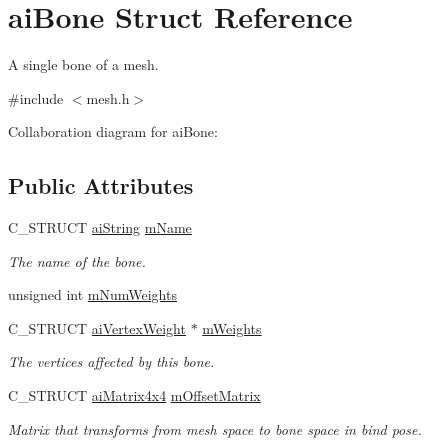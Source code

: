 \hypertarget{structai_bone}{\section{ai\-Bone Struct Reference}
\label{structai_bone}
}


A single bone of a mesh.  




{\ttfamily \#include $<$mesh.\-h$>$}



Collaboration diagram for ai\-Bone\-:
\subsection*{Public Attributes}
\begin{DoxyCompactItemize}
\item 
\hypertarget{structai_bone_acfb9bfd2a2c6302181d7c3cc1bb8bbf0}{C\-\_\-\-S\-T\-R\-U\-C\-T \hyperlink{structai_string}{ai\-String} \hyperlink{structai_bone_acfb9bfd2a2c6302181d7c3cc1bb8bbf0}{m\-Name}}\label{structai_bone_acfb9bfd2a2c6302181d7c3cc1bb8bbf0}

\begin{DoxyCompactList}\small\item\em The name of the bone. \end{DoxyCompactList}\item 
unsigned int \hyperlink{structai_bone_a87a79d42a0132753aac66397ad6f9b71}{m\-Num\-Weights}
\item 
\hypertarget{structai_bone_ade36319714b58c03ad46aae30a2724a4}{C\-\_\-\-S\-T\-R\-U\-C\-T \hyperlink{structai_vertex_weight}{ai\-Vertex\-Weight} $\ast$ \hyperlink{structai_bone_ade36319714b58c03ad46aae30a2724a4}{m\-Weights}}\label{structai_bone_ade36319714b58c03ad46aae30a2724a4}

\begin{DoxyCompactList}\small\item\em The vertices affected by this bone. \end{DoxyCompactList}\item 
\hypertarget{structai_bone_a1dd6c4f24a1384c05da281692be3e78d}{C\-\_\-\-S\-T\-R\-U\-C\-T \hyperlink{structai_matrix4x4}{ai\-Matrix4x4} \hyperlink{structai_bone_a1dd6c4f24a1384c05da281692be3e78d}{m\-Offset\-Matrix}}\label{structai_bone_a1dd6c4f24a1384c05da281692be3e78d}

\begin{DoxyCompactList}\small\item\em Matrix that transforms from mesh space to bone space in bind pose. \end{DoxyCompactList}\end{DoxyCompactItemize}


